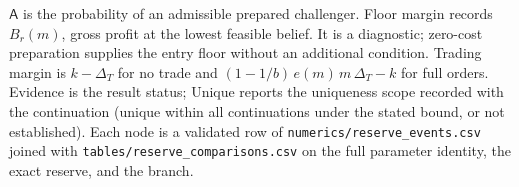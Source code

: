\begin{landscape}
\begin{table}[tbp]
\begin{threeparttable}
\begin{tablenotes}
\item $\mathsf A$ is the probability of an admissible prepared challenger. Floor margin records $B_r(m)$, gross profit at the lowest feasible belief. It is a diagnostic; zero-cost preparation supplies the entry floor without an additional condition. Trading margin is $k-\Delta_T$ for no trade and $(1-1/b)\,e(m)\,m\,\Delta_T-k$ for full orders. Evidence is the result status; Unique reports the uniqueness scope recorded with the continuation (unique within all continuations under the stated bound, or not established). Each node is a validated row of \texttt{numerics/reserve\_events.csv} joined with \texttt{tables/reserve\_comparisons.csv} on the full parameter identity, the exact reserve, and the branch.
\end{tablenotes}
\end{threeparttable}
\par\endgroup\end{table}
\end{landscape}
